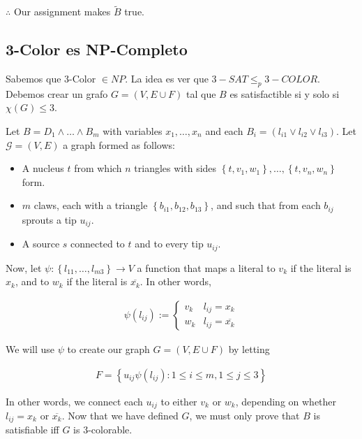 \documentclass[a4paper, 12pt]{article}
\begin{document}
$\therefore $ Our assignment makes $\tilde{ B }$ true.

\pagebreak 


\subsection{3-Color es NP-Completo}

Sabemos que $3$-Color $\in NP$. La idea es ver que $3-SAT \leq_p 3-COLOR$. 
Debemos crear un grafo $G = (V, E \cup F) $ tal que $B$ es satisfactible 
si y solo si $\chi(G) \leq 3$.

Let $B = D_1 \land  \ldots \land  B_m$ with variables $x_1, \ldots, x_n$ and each $B_i
= (l_{i1} \lor l_{i2} \lor  l_{i3})$. Let $\mathcal{G} = (V, E)$ a graph 
formed as follows: 

\begin{itemize}
    \item A nucleus $t$ from which $n$ triangles with sides $\left\{ t, v_1, w_1 \right\}, \ldots, \left\{ t, v_n, w_n \right\}  $ form.
    \item $m$ claws, each with a triangle $\left\{ b_{i1}, b_{12}, b_{13} \right\} $, and such that from each $b_{ij}$ sprouts a tip $u_{ij}$.
    \item A source $s$ connected to $t$ and to every tip $u_{ij}$.
\end{itemize}

Now, let $\psi : \left\{ l_{11}, \ldots, l_{m3} \right\} \to V$ a function that maps a literal to $v_k$ if the literal is $x_k$, and to $w_k$ if the literal is $\overline{x_k}$. In other words, 

\begin{align*}
    \psi(l_{ij}) := \begin{cases}
        v_k & l_{ij} = x_k \\ 
        w_k & l_{ij} = \overline{x_k}
    \end{cases}
\end{align*}


We will use $\psi$ to create our graph $G = (V, E \cup F)$ by letting


\begin{align*}
    F = \left\{ u_{ij}\psi(l_{ij}) : 1 \leq i \leq m, 1 \leq j \leq 3 \right\} 
\end{align*}

In other words, we connect each $u_{ij}$ to either $v_k$ or $w_k$, depending 
on whether $l_{ij} = x_k$ or $\overline{x_k}$. Now that we have defined 
$G$, we must only prove that $B$ is satisfiable iff $G$ is $3$-colorable.
\end{document}
